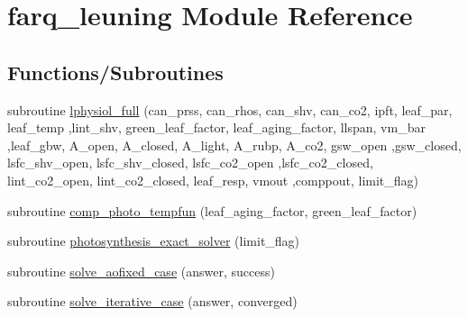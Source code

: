 \hypertarget{namespacefarq__leuning}{}\section{farq\+\_\+leuning Module Reference}
\label{namespacefarq__leuning}
\subsection*{Functions/\+Subroutines}
\begin{DoxyCompactItemize}
\item 
subroutine \hyperlink{namespacefarq__leuning_a93499fd595f405b9df3bf88c5be1569e}{lphysiol\+\_\+full} (can\+\_\+prss, can\+\_\+rhos, can\+\_\+shv, can\+\_\+co2, ipft, leaf\+\_\+par, leaf\+\_\+temp                                                                                                                           ,lint\+\_\+shv, green\+\_\+leaf\+\_\+factor, leaf\+\_\+aging\+\_\+factor, llspan, vm\+\_\+bar                                                                                                                       ,leaf\+\_\+gbw, A\+\_\+open, A\+\_\+closed, A\+\_\+light, A\+\_\+rubp, A\+\_\+co2, gsw\+\_\+open                                                                                                                                       ,gsw\+\_\+closed, lsfc\+\_\+shv\+\_\+open, lsfc\+\_\+shv\+\_\+closed, lsfc\+\_\+co2\+\_\+open                                                                                                                                       ,lsfc\+\_\+co2\+\_\+closed, lint\+\_\+co2\+\_\+open, lint\+\_\+co2\+\_\+closed, leaf\+\_\+resp, vmout                                                                                                           ,comppout, limit\+\_\+flag)
\item 
subroutine \hyperlink{namespacefarq__leuning_a9b3b89dd90573241f7a95685e0c416f6}{comp\+\_\+photo\+\_\+tempfun} (leaf\+\_\+aging\+\_\+factor, green\+\_\+leaf\+\_\+factor)
\item 
subroutine \hyperlink{namespacefarq__leuning_a874ab59c974d12da5a8ea01c48dd089c}{photosynthesis\+\_\+exact\+\_\+solver} (limit\+\_\+flag)
\item 
subroutine \hyperlink{namespacefarq__leuning_a8dbd2dbff6eba13ef68535d94a06a569}{solve\+\_\+aofixed\+\_\+case} (answer, success)
\item 
subroutine \hyperlink{namespacefarq__leuning_a88f53f468e321e185e87a1fa9f890116}{solve\+\_\+iterative\+\_\+case} (answer, converged)

\end{DoxyCompactItemize}

